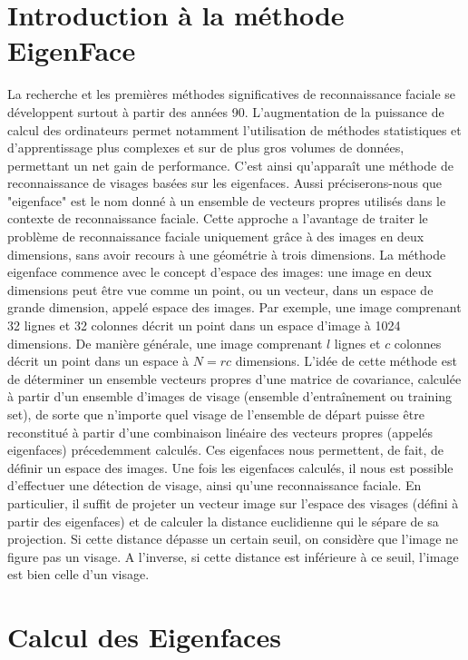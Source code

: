 \documentclass[12pt,french]{article}
\theoremstyle{plain}
\theoremstyle{definition}
\begin{document}
\section{Introduction à la méthode EigenFace}
La recherche et les premières méthodes significatives de reconnaissance faciale se développent surtout à partir des années 90.
L’augmentation de la puissance de calcul des ordinateurs permet notamment l’utilisation de méthodes statistiques et d’apprentissage plus complexes et sur de plus gros volumes de données, permettant un net gain de performance.
C'est ainsi qu'apparaît une méthode de reconnaissance de visages basées sur les eigenfaces.
Aussi préciserons-nous que "eigenface" est le nom donné à un ensemble de vecteurs propres utilisés dans le contexte de reconnaissance faciale.
Cette approche a l'avantage de traiter le problème de reconnaissance faciale uniquement grâce à des images en deux dimensions, sans avoir recours à une géométrie à trois dimensions.
La méthode eigenface commence avec le concept d'espace des images: une image en deux dimensions peut être vue comme un point, ou un vecteur, dans un espace de grande dimension, appelé espace des images.
Par exemple, une image comprenant 32 lignes et 32 colonnes décrit un point dans un espace d'image à 1024 dimensions.
De manière générale, une image comprenant $l$ lignes et $c$ colonnes décrit un point dans un espace à $N = rc$ dimensions.
L'idée de cette méthode est de déterminer un ensemble vecteurs propres d'une matrice de covariance, calculée à partir d'un ensemble d'images de visage (ensemble d'entraînement ou training set), de sorte que n'importe quel visage de l'ensemble de départ puisse être reconstitué à partir d'une combinaison linéaire des vecteurs propres (appelés eigenfaces) précedemment calculés.
Ces eigenfaces nous permettent, de fait, de définir un espace des images.
Une fois les eigenfaces calculés, il nous est possible d'effectuer une détection de visage, ainsi qu'une reconnaissance faciale.
En particulier, il suffit de projeter un vecteur image sur l'espace des visages (défini à partir des eigenfaces) et de calculer la distance euclidienne qui le sépare de sa projection.
Si cette distance dépasse un certain seuil, on considère que l'image ne figure pas un visage. A l'inverse, si cette distance est inférieure à ce seuil, l'image est bien celle d'un visage. 

\section{Calcul des Eigenfaces}
\end{document}
